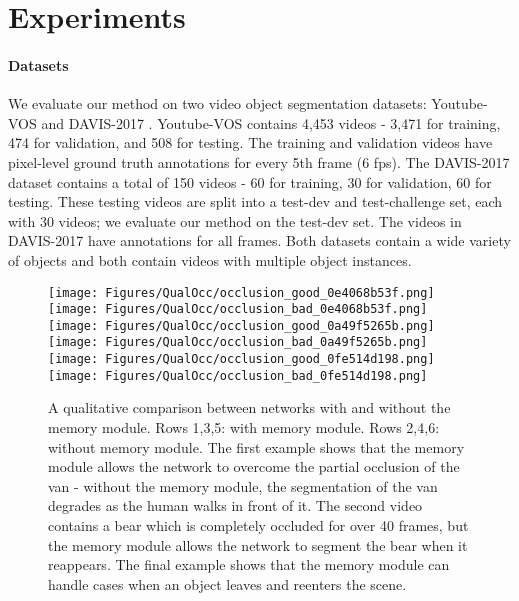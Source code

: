 \documentclass[10pt,twocolumn,letterpaper]{article}
\begin{document}
 


\section{Experiments}
\paragraph{Datasets}
We evaluate our method on two video object segmentation datasets: Youtube-VOS \cite{xu2018youtube2} and DAVIS-2017 \cite{pont20172017}. Youtube-VOS contains 4,453 videos - 3,471 for training, 474 for validation, and 508 for testing. The training and validation videos have pixel-level ground truth annotations for every 5th frame (6 fps). The DAVIS-2017 dataset contains a total of 150 videos - 60 for training, 30 for validation, 60 for testing. These testing videos are split into a test-dev and test-challenge set, each with 30 videos; we evaluate our method on the test-dev set. The videos in DAVIS-2017 have annotations for all frames. Both datasets contain a wide variety of objects and both contain videos with multiple object instances.

\begin{figure*}[ht!]
\begin{center}
\texttt{[image: Figures/QualOcc/occlusion\_good\_0e4068b53f.png]}
\texttt{[image: Figures/QualOcc/occlusion\_bad\_0e4068b53f.png]}
\texttt{[image: Figures/QualOcc/occlusion\_good\_0a49f5265b.png]}
\texttt{[image: Figures/QualOcc/occlusion\_bad\_0a49f5265b.png]}
\texttt{[image: Figures/QualOcc/occlusion\_good\_0fe514d198.png]}
\texttt{[image: Figures/QualOcc/occlusion\_bad\_0fe514d198.png]}

\end{center}
   \caption{A qualitative comparison between networks with and without the memory module. Rows 1,3,5: with memory module. Rows 2,4,6: without memory module. The first example shows that the memory module allows the network to overcome the partial occlusion of the van - without the memory module, the segmentation of the van degrades as the human walks in front of it. The second video contains a bear which is completely occluded for over 40 frames, but the memory module allows the network to segment the bear when it reappears. The final example shows that the memory module can handle cases when an object leaves and reenters the scene.}
\label{fig:qualitative-occ}
\end{figure*}
\end{document}
